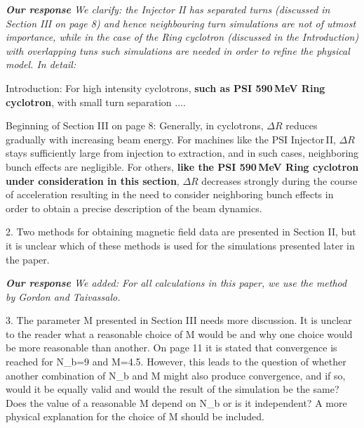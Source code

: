 \documentclass{article}
\begin{document}
  \vspace{+2mm}
 {\it {\bf Our response}  We clarify:  the Injector II has separated turns (discussed in Section III on page 8) and
 hence neighbouring turn simulations are not of utmost importance, while in the case of 
 the Ring cyclotron (discussed in the Introduction)  with overlapping tuns such simulations are needed in order to 
 refine the physical model. In detail:
 
Introduction:  For high intensity cyclotrons, {\bf such as PSI 590\,MeV Ring cyclotron}, with small turn separation .... 

Beginning of Section III on page 8: Generally, in cyclotrons, $\Delta R$ reduces gradually  with increasing beam energy.
For machines like the PSI Injector\,II, $\Delta R$ stays sufficiently large from injection to extraction, and in such cases,  neighboring bunch effects are negligible. 
For others, {\bf  like the PSI 590\,MeV Ring cyclotron under consideration in this section}, $\Delta R$ decreases strongly during the course of acceleration resulting in the need to consider neighboring bunch effects in order to obtain a precise description of the beam dynamics.
 \vspace{+2mm}
 
 2. Two methods for obtaining magnetic field data are presented in Section 
 II, but it is unclear which of these methods is used for the simulations 
 presented later in the paper. 
 
 \vspace{+2mm}
 {\it {\bf Our response} We added: For all calculations in this paper, we use the method by Gordon and Taivassalo.
 \vspace{+2mm}
 
 
 3. The parameter M presented in Section III needs more discussion. It is 
 unclear to the reader what a reasonable choice of M would be and why one 
 choice would be more reasonable than another. On page 11 it is stated that 
 convergence is reached for N{\_}b=9 and M=4.5. However, this leads to the 
 question of whether another combination of N{\_}b and M might also produce 
 convergence, and if so, would it be equally valid and would the result of 
 the simulation be the same? Does the value of a reasonable M depend on 
 N{\_}b or is it independent? A more physical explanation for the choice of M 
 should be included. 

}}
\end{document}
